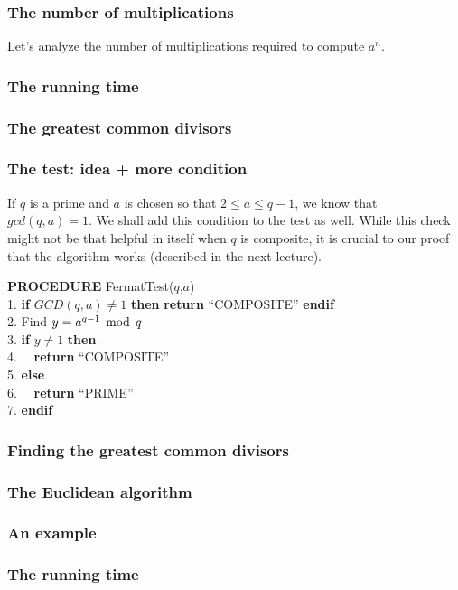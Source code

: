 \begin{frame}\frametitle{The number of multiplications}
  Let's analyze the number of multiplications required to compute
  $a^n$.
\end{frame}

\begin{frame}\frametitle{The running time}
\end{frame}

\begin{frame}\frametitle{The greatest common divisors}
\end{frame}

\begin{frame}\frametitle{The test: idea + more condition}
  If $q$ is a prime and $a$ is chosen so that $2\leq a\leq q-1$, we
  know that $gcd(q,a)=1$.  We shall add this condition to the test as
  well.  While this check might not be that helpful in itself when $q$
  is composite, it is crucial to our proof that the algorithm works
  (described in the next lecture).

  \begin{tcolorbox}
    {\bf PROCEDURE} FermatTest($q$,$a$)\\
    1. {\bf if} $GCD(q,a)\neq 1$ {\bf then} {\bf return} ``COMPOSITE'' {\bf endif}\\
    2. Find $y = a^{q-1}\,\bmod\, q$\\
    3. {\bf if} $y\neq 1$ {\bf then}\\
    4. \ \ {\bf return} ``COMPOSITE''\\
    5. {\bf else}\\
    6. \ \ {\bf return} ``PRIME''\\
    7. {\bf endif}
  \end{tcolorbox}
\end{frame}

\begin{frame}\frametitle{Finding the greatest common divisors}
\end{frame}

\begin{frame}\frametitle{The Euclidean algorithm}
\end{frame}

\begin{frame}\frametitle{An example}
\end{frame}

\begin{frame}\frametitle{The running time}
\end{frame}

